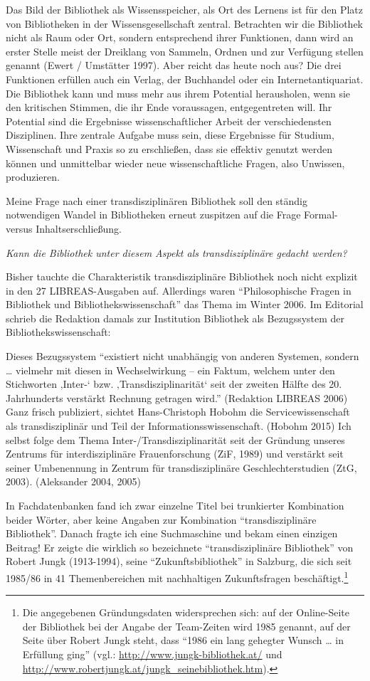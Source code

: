 Das Bild der Bibliothek als Wissensspeicher, als Ort des Lernens ist für
den Platz von Bibliotheken in der Wissensgesellschaft zentral.
Betrachten wir die Bibliothek nicht als Raum oder Ort, sondern
entsprechend ihrer Funktionen, dann wird an erster Stelle meist der
Dreiklang von Sammeln, Ordnen und zur Verfügung stellen genannt (Ewert /
Umstätter 1997). Aber reicht das heute noch aus? Die drei Funktionen
erfüllen auch ein Verlag, der Buchhandel oder ein Internetantiquariat.
Die Bibliothek kann und muss mehr aus ihrem Potential herausholen, wenn
sie den kritischen Stimmen, die ihr Ende voraussagen, entgegentreten
will. Ihr Potential sind die Ergebnisse wissenschaftlicher Arbeit der
verschiedensten Disziplinen. Ihre zentrale Aufgabe muss sein, diese
Ergebnisse für Studium, Wissenschaft und Praxis so zu erschließen, dass
sie effektiv genutzt werden können und unmittelbar wieder neue
wissenschaftliche Fragen, also Unwissen, produzieren.

Meine Frage nach einer transdisziplinären Bibliothek soll den ständig
notwendigen Wandel in Bibliotheken erneut zuspitzen auf die Frage
Formal- versus Inhaltserschließung.

\emph{Kann die Bibliothek unter diesem Aspekt als transdisziplinäre
gedacht werden?}

Bisher tauchte die Charakteristik transdisziplinäre Bibliothek noch
nicht explizit in den 27 LIBREAS-Ausgaben auf. Allerdings waren
\enquote{Philosophische Fragen in Bibliothek und
Bibliothekswissenschaft} das Thema im Winter 2006. Im Editorial schrieb
die Redaktion damals zur Institution Bibliothek als Bezugssystem der
Bibliothekswissenschaft:

Dieses Bezugssystem \enquote{existiert nicht unabhängig von anderen
Systemen, sondern \ldots{} vielmehr mit diesen in Wechselwirkung -- ein
Faktum, welchem unter den Stichworten ‚Inter-` bzw.
‚Transdisziplinarität` seit der zweiten Hälfte des 20. Jahrhunderts
verstärkt Rechnung getragen wird.} (Redaktion LIBREAS 2006) Ganz frisch
publiziert, sichtet Hans-Christoph Hobohm die Servicewissenschaft als
transdisziplinär und Teil der Informationsswissenschaft. (Hobohm 2015)
Ich selbst folge dem Thema Inter-/Transdisziplinarität seit der Gründung
unseres Zentrums für interdisziplinäre Frauenforschung (ZiF, 1989) und
verstärkt seit seiner Umbenennung in Zentrum für transdisziplinäre
Geschlechterstudien (ZtG, 2003). (Aleksander 2004, 2005)

In Fachdatenbanken fand ich zwar einzelne Titel bei trunkierter
Kombination beider Wörter, aber keine Angaben zur Kombination
\enquote{transdisziplinäre Bibliothek}. Danach fragte ich eine
Suchmaschine und bekam einen einzigen Beitrag! Er zeigte die wirklich so
bezeichnete \enquote{transdisziplinäre Bibliothek} von Robert Jungk
(1913-1994), seine \enquote{Zukunftsbibliothek} in Salzburg, die sich
seit 1985/86 in 41 Themenbereichen mit nachhaltigen Zukunftsfragen
beschäftigt.\footnote{Die angegebenen Gründungsdaten widersprechen sich:
  auf der Online-Seite der Bibliothek bei der Angabe der Team-Zeiten
  wird 1985 genannt, auf der Seite über Robert Jungk steht, dass
  \enquote{1986 ein lang gehegter Wunsch \ldots{} in Erfüllung ging}
  (vgl.: \url{http://www.jungk-bibliothek.at/} und
  \url{http://www.robertjungk.at/jungk_seinebibliothek.htm}).}


